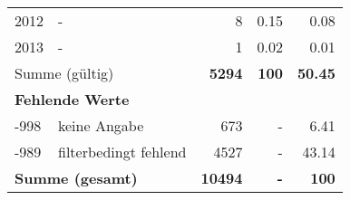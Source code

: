 \begin{longtable}{lXrrr}
     2012 &
     \multicolumn{1}{X}{ -  } &


       \num{8} &
       \num[round-mode=places,round-precision=2]{0.15} &
         \num[round-mode=places,round-precision=2]{0.08} \\

     2013 &
     \multicolumn{1}{X}{ -  } &


       \num{1} &
       \num[round-mode=places,round-precision=2]{0.02} &
         \num[round-mode=places,round-precision=2]{0.01} \\
     \midrule
     \multicolumn{2}{l}{Summe (gültig)} &
       \textbf{\num{5294}} &
     \textbf{\num{100}} &
       \textbf{\num[round-mode=places,round-precision=2]{50.45}} \\
     \multicolumn{5}{l}{\textbf{Fehlende Werte}}\\
       -998 &
       keine Angabe &
         \num{673} &
        - &
         \num[round-mode=places,round-precision=2]{6.41} \\
       -989 &
       filterbedingt fehlend &
         \num{4527} &
        - &
         \num[round-mode=places,round-precision=2]{43.14} \\
     \midrule
     \multicolumn{2}{l}{\textbf{Summe (gesamt)}} &
          \textbf{\num{10494}} &
        \textbf{-} &
        \textbf{\num{100}} \\
     \bottomrule
     \end{longtable}
     
